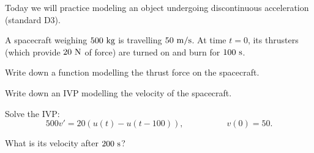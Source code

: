 \begin{applicationActivities}

\begin{observation}
Today we will practice modeling an object undergoing discontinuous acceleration (standard D3).
\end{observation}

\begin{activity}{30}
A spacecraft weighing \(500\ {\rm kg}\) is travelling \(50\ {\rm m/s}\).  At time \(t=0\), its thrusters (which provide \(20\ {\rm N}\) of force) are turned on and burn for \(100\ {\rm s}\).  
\begin{subactivity}
Write down a function modelling the thrust force on the spacecraft.
\end{subactivity}
\begin{subactivity}
Write down an IVP modelling the velocity of the spacecraft.
\end{subactivity}
\begin{subactivity}
Solve the IVP: \[ 500v' = 20 \left( u(t)-u(t-100)\right), \hspace{5em} v(0)=50.\]
\end{subactivity}
\begin{subactivity}
What is its velocity after \(200\ {\rm s}\)?
\end{subactivity}
\end{activity}
\end{applicationActivities}

